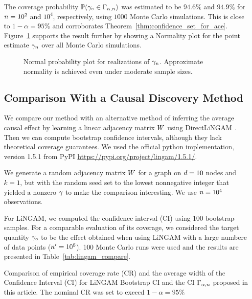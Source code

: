 The coverage probability $\mathbb{P} ( \gamma_\circ \in  \Gamma_{\alpha, n}  )$ was estimated to be $94.6 \%$ and $94.9\%$ for $n=10^2$ and $10^4$, respectively, using $1000$ Monte Carlo simulations. This is close to $1-\alpha=95\%$ and corroborates Theorem~\ref{thm:confidence_set_for_ace}.
Figure~\ref{fig:calibration_qq} supports the result further by showing a Normality plot for the point estimate $\gamma_n$ over all Monte Carlo simulations.

\begin{figure}[htbp]
     \centering
     
     \caption{Normal probability plot for realizations of $\gamma_n$. Approximate normality is achieved even under moderate sample sizes.}
     \label{fig:calibration_qq}
\end{figure}

\subsection{Comparison With a Causal Discovery Method}

We compare our method with an alternative method of inferring the average causal effect by learning a linear \scm{} adjacency matrix $W$ using DirectLiNGAM  \citep{shimizu_directlingam_2011, hyvarinen_pairwise_2013}. Then we can compute bootstrap confidence intervals, although they lack theoretical coverage guarantees. We used the official python implementation, version 1.5.1 from PyPI \url{https://pypi.org/project/lingam/1.5.1/}.

We generate a random adjacency matrix $W$ for a graph on $d=10$ nodes and $k=1$, but with the random seed set to the lowest nonnegative integer that yielded a nonzero $\gamma$ to make the comparison interesting. We use $n=10^{4}$ observations.

For LiNGAM, we computed the confidence interval (CI) using 100 bootstrap samples. For a comparable evaluation of its coverage, we considered the target quantity $\gamma_\circ$ to be the effect obtained when using LiNGAM with a large numbere of data points ($n'=10^6$). 100 Monte Carlo runs were used and the results are presented in Table~\ref{tab:lingam_compare}.

\begin{table}
     \centering
     \caption{Comparison of empirical coverage rate (CR) and the average width of the Confidence Interval (CI) for LiNGAM Bootstrap CI and the CI $\Gamma_{\alpha,n}$ proposed in this article. The nominal CR was set to exceed $1-\alpha = 95\%$}\label{tab:lingam_compare}
     
\end{table}

